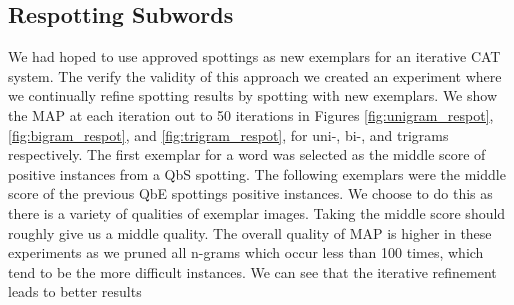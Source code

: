 \documentclass[ms,electronic,twosidetoc,letterpaper,chaptercenter,parttop,lol,lof,lot]{byumsphd}
\begin{document}
\subsection{Respotting Subwords}

We had hoped to use approved spottings as new exemplars for an iterative CAT system. The verify the validity of this approach we created an experiment where we continually refine spotting results by spotting with new exemplars. We show the MAP at each iteration out to 50 iterations in Figures \ref{fig:unigram_respot}, \ref{fig:bigram_respot}, and \ref{fig:trigram_respot}, for uni-, bi-, and trigrams respectively. The first exemplar for a word was selected as the middle score of positive instances from a QbS spotting. The following exemplars were the middle score of the previous QbE spottings positive instances. We choose to do this as there is a variety of qualities of exemplar images. Taking the middle score should roughly give us a middle quality. The overall quality of MAP is higher in these experiments as we pruned all n-grams which occur less than 100 times, which tend to be the more difficult instances.
We can see that the iterative refinement leads to better results
\end{document}
